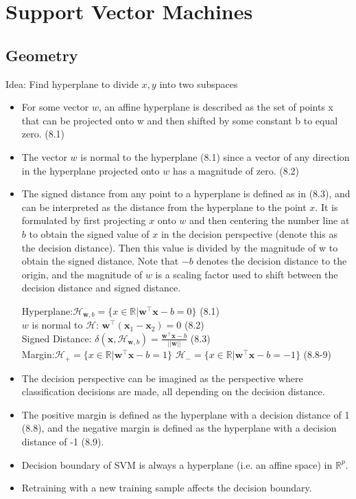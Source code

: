 \documentclass[english]{latex4ei/latex4ei_sheet}
\begin{document}
\section{Support Vector Machines}
\begin{sectionbox}
\subsection{Geometry}
Idea: Find hyperplane to divide $x, y$ into two subspaces
\begin{itemize}
\item For some vector $w$, an affine hyperplane is described as the set of points x that can be projected onto w and then shifted by some constant b to equal zero. (8.1)
\item The vector $w$ is normal to the hyperplane (8.1) since a vector of any direction in the hyperplane projected onto $w$ has a magnitude of zero. (8.2)
\item The signed distance from any point to a hyperplane is defined as in (8.3), and can be interpreted as the distance from the hyperplane to the point $x$. It is formulated by first projecting $x$ onto $w$ and then centering the number line at $b$ to obtain the signed value of $x$ in the decision perspective (denote this as the decision distance). Then this value is divided by the magnitude of w to obtain the signed distance. Note that $-b$ denotes the decision distance to the origin, and the magnitude of $w$ is a scaling factor used to shift between the decision distance and signed distance.
\begin{emphbox}
    Hyperplane:$\mathcal{H}_{\mathbf{w},b}=\{x\in \mathbb{R} | \mathbf{w}^{\top}\mathbf{x}-b=0\}$ (8.1)\\
    $w$ is normal to $\mathcal{H}$: $\mathbf{w}^{\top}(\mathbf{x}_1-\mathbf{x}_2)=0$ (8.2)\\
    Signed Distance: $\delta(\mathbf{x}, \mathcal{H}_{\mathbf{w},b})=\frac{\mathbf{w^{\top}x}-b}{||\mathbf{w}||}$ (8.3)\\
    Margin:$\mathcal{H}_{+}=\{x\in \mathbb{R} | \mathbf{w}^{\top}\mathbf{x}-b=1\}$ $\mathcal{H}_{-}=\{x\in \mathbb{R} | \mathbf{w}^{\top}\mathbf{x}-b=-1\}$ (8.8-9)
\end{emphbox}
\item The decision perspective can be imagined as the perspective where classification decisions are made, all depending on the decision distance.
\item The positive margin is defined as the hyperplane with a decision distance of 1 (8.8), and the negative margin is defined as the hyperplane with a decision distance of -1 (8.9).
\item Decision boundary of SVM is always a hyperplane (i.e. an affine space) in $\mathbb{R}^p$.
\item Retraining with a new training sample affects the decision boundary.
\end{itemize}


\end{sectionbox}
\end{document}
